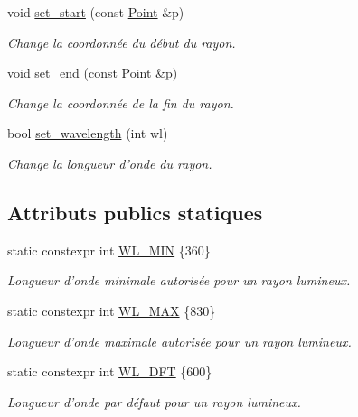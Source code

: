\begin{DoxyCompactItemize}
void \hyperlink{classRay_a137b80cf87ab000bcb158980ebe288f6}{set\+\_\+start} (const \hyperlink{classPoint}{Point} \&p)
\begin{DoxyCompactList}\small\item\em Change la coordonnée du début du rayon. \end{DoxyCompactList}\item 
void \hyperlink{classRay_a1e8a43e951a1b21cc6e8548590c6da2e}{set\+\_\+end} (const \hyperlink{classPoint}{Point} \&p)
\begin{DoxyCompactList}\small\item\em Change la coordonnée de la fin du rayon. \end{DoxyCompactList}\item 
bool \hyperlink{classRay_a1336c12ef2df730a27b8315c323d8414}{set\+\_\+wavelength} (int wl)
\begin{DoxyCompactList}\small\item\em Change la longueur d'onde du rayon. \end{DoxyCompactList}\end{DoxyCompactItemize}
\subsection*{Attributs publics statiques}
\begin{DoxyCompactItemize}
\item 
static constexpr int \hyperlink{classRay_afecf2fa5a603689c3e77cbefbe08ffb1}{W\+L\+\_\+\+M\+I\+N} \{360\}
\begin{DoxyCompactList}\small\item\em Longueur d'onde minimale autorisée pour un rayon lumineux. \end{DoxyCompactList}\item 
static constexpr int \hyperlink{classRay_a95eddd74f049d2511ffa09242b937b2c}{W\+L\+\_\+\+M\+A\+X} \{830\}
\begin{DoxyCompactList}\small\item\em Longueur d'onde maximale autorisée pour un rayon lumineux. \end{DoxyCompactList}\item 
static constexpr int \hyperlink{classRay_aa08b1d2a9423fab3502c460d787b7551}{W\+L\+\_\+\+D\+F\+T} \{600\}
\begin{DoxyCompactList}\small\item\em Longueur d'onde par défaut pour un rayon lumineux. \end{DoxyCompactList}\end{DoxyCompactItemize}
